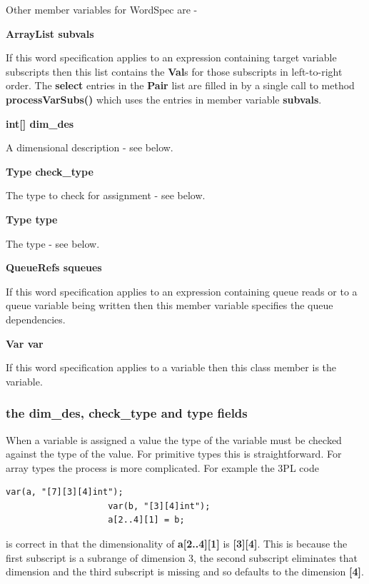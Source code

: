             Other member variables for WordSpec are -

            {\bf ArrayList subvals}

            If this word specification applies to an expression containing
            target variable subscripts then this list contains the {\bf Val}s for
            those subscripts in left-to-right order. The {\bf select} entries
            in the {\bf Pair} list are filled in by a single call to method
            {\bf processVarSubs()} which uses the entries in member variable
            {\bf subvals}.

            {\bf int[] dim\_des}

            A dimensional description - see below.

            {\bf Type check\_type}

            The type to check for assignment - see below.

            {\bf Type type}

            The type - see below.

            {\bf QueueRefs squeues}

            If this word specification applies to an expression containing
            queue reads or to a queue variable being written then this member variable
            specifies the queue dependencies.

            {\bf Var var}

            If this word specification applies to a variable then this class member
            is the variable.



            \subsubsection{the dim\_des, check\_type and type fields}

                When a variable is assigned a value the type of the variable
                must be checked against the type of the value. For primitive
                types this is straightforward. For array types the process
                is more complicated. For example the 3PL code
                \begin{lstlisting}[gobble=16, language=threepl]
                    var(a, "[7][3][4]int");
                    var(b, "[3][4]int");
                    a[2..4][1] = b;
                \end{lstlisting}
                is correct in that the dimensionality of {\bf a[2..4][1]} is
                {\bf [3][4]}. This is because the first subscript is a subrange
                of dimension 3, the second subscript eliminates that dimension
                and the third subscript is missing and so defaults to the
                dimension {\bf [4]}.

